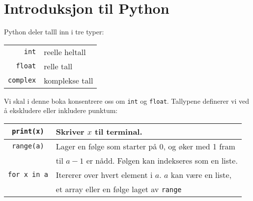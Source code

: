 





\section{Introduksjon til Python}

Python deler talll inn i tre typer:
\begin{center}
	\begin{tabular}{r|l}
		\texttt{int} & reelle heltall \\
		\texttt{float} & relle tall \\
		\texttt{complex} & komplekse tall
	\end{tabular} 
\end{center}
Vi skal i denne boka konsentrere oss om \texttt{int} og \texttt{float}. Tallypene definerer vi ved å ekskludere eller inkludere punktum:


\begin{center}
	\begin{tabular}{c|l} \hline
		\texttt{print(x)} & Skriver $ x $ til terminal. \\ \hline
		\texttt{range(a)} & Lager en følge som starter på 0, og øker med 1 fram \\
		&til $ a-1 $ er nådd. Følgen kan indekseres som en liste.		\\ \hline
		\texttt{for x in a} & Itererer over hvert element i $ a $. $ a $ kan være en liste, \\
		&et array eller en følge laget av \texttt{range} \\
	\end{tabular} 
\end{center}


